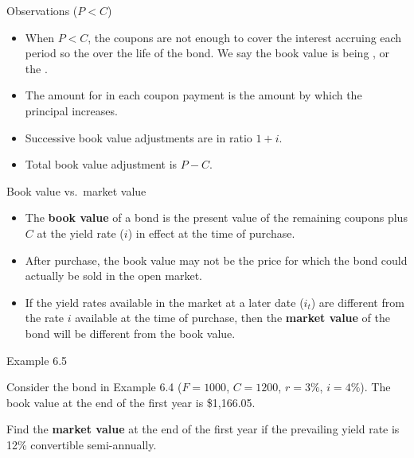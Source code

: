 \documentclass{beamer}
\begin{document}
\begin{frame}{Observations ($P < C$)}

\begin{itemize}
\item When $P < C$, the coupons are not enough to cover the interest accruing each period so the  over the life of the bond. We say the book value is being , or the .
\item The amount for  in each coupon payment is the amount by which the principal increases.
\item Successive book value adjustments are in ratio $1+i$.
\item Total book value adjustment is $P - C$.
\end{itemize}

\end{frame}

\begin{frame}{Book value vs.\ market value}

\begin{itemize}
\item The \textbf{book value} of a bond is the present value of the remaining coupons plus $C$ at the yield rate ($i$) in effect at the time of purchase.
\item After purchase, the book value may not be the price for which the bond could actually be sold in the open market.
\item If the yield rates available in the market at a later date ($i_t$) are different from the rate $i$ available at the time of purchase, then the \textbf{market value} of the bond will be different from the book value.
\end{itemize}

\end{frame}

\begin{frame}{Example 6.5}

Consider the bond in Example 6.4 ($F = 1000$, $C = 1200$, $r = 3\%$, $i = 4\%$). The book value at the end of the first year is \$1,166.05.

\begin{center}
\end{center}

Find the \textbf{market value} at the end of the first year if the prevailing yield rate is 12\% convertible semi-annually.

\vfill
\end{frame}
\end{document}
